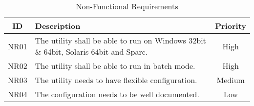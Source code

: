 \begin{table}[ht] \center
\caption{Non-Functional Requirements\label{tab:nonfuncreq}}
\begin{tabular}{| c | p{9cm} | c |}
	\hline ID & Description & Priority \\
	\hline NR01 & The utility shall be able to run on Windows 32bit \& 64bit,
		Solaris 64bit and Sparc. & High \\
	\hline NR02 & The utility shall be able to run in batch mode. & High \\
	\hline NR03 & The utility needs to have flexible configuration. & Medium \\
	\hline NR04 & The configuration needs to be well documented. & Low \\
	\hline
\end{tabular}
\end{table}

